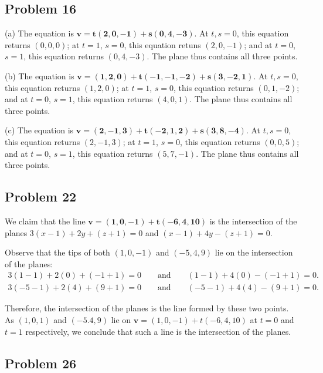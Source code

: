 \documentclass[11pt]{article}
\renewcommand{\vec}[1]{\mathbf{#1}}
\begin{document}
\subsection*{Problem 16}

(a) The equation is $\vec{v} = \mathbf{t(2, 0, -1) + s(0, 4, -3)}$. At $t, s = 0$, this equation returns $(0, 0, 0)$; at $t = 1$, $s = 0$, this equation retuns $(2, 0, -1)$; and at $t = 0$, $s = 1$, this equation returns $(0, 4, -3)$. The plane thus contains all three points.

(b) The equation is $\vec{v} = \mathbf{(1, 2, 0) + t(-1, -1, -2) + s(3, -2, 1)}$. At $t, s = 0$, this equation returns $(1, 2, 0)$; at $t = 1$, $s = 0$, this equation returns $(0, 1, -2)$; and at $t = 0$, $s = 1$, this equation returns $(4, 0, 1)$. The plane thus contains all three points.

(c) The equation is $\vec{v} = \mathbf{(2, -1, 3) + t(-2, 1, 2) + s(3, 8, -4)}$. At $t, s = 0$, this equation returns $(2, -1, 3)$; at $t = 1$, $s = 0$, this equation returns $(0, 0, 5)$; and at $t = 0$, $s = 1$, this equation returns $(5, 7, -1)$. The plane thus contains all three points.

\subsection*{Problem 22}

We claim that the line $\vec{v} = \mathbf{(1, 0, -1) + t(-6, 4, 10)}$ is the intersection of the planes $3(x-1) + 2y + (z + 1) = 0$ and $(x-1) + 4y - (z + 1) = 0$. 

Observe that the tips of both $(1, 0, -1)$ and $(-5, 4, 9)$ lie on the intersection of the planes:
\begin{align*}
	3(1 - 1) + 2(0) + (-1 + 1) = 0 \qquad \text{and} \qquad (1 - 1) + 4(0) - (-1 + 1) = 0. \\
	3(-5 - 1) + 2(4) + (9 + 1) = 0 \qquad \text{and} \qquad (-5 - 1) + 4(4) - (9 + 1) = 0. 
\end{align*}

Therefore, the intersection of the planes is the line formed by these two points. As $(1, 0, 1)$ and $(-5. 4, 9)$ lie on $\vec{v} = (1, 0, -1) + t(-6, 4, 10)$ at $t = 0$ and $t = 1$ respectively, we conclude that such a line is the intersection of the planes.

\subsection*{Problem 26}
\end{document}
